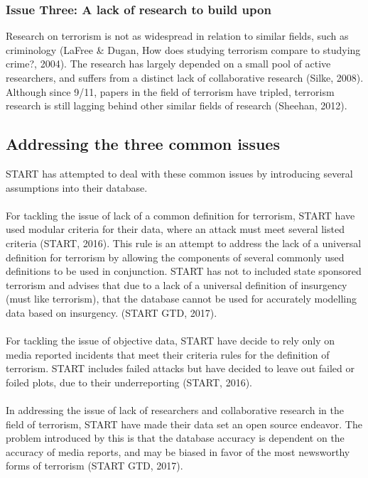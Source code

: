\documentclass[10pt,a4paper]{article}
\begin{document}
			\subsubsection{Issue Three: A lack of research to build upon}
Research on terrorism is not as widespread in relation to similar fields, such as criminology (LaFree \& Dugan, How does studying terrorism compare to studying crime?, 2004). The research has largely depended on a small pool of active researchers, and suffers from a distinct lack of collaborative research (Silke, 2008). Although since 9/11, papers in the field of terrorism have tripled, terrorism research is still lagging behind other similar fields of research (Sheehan, 2012).

		\subsection{Addressing the three common issues}
START has attempted to deal with these common issues by introducing several assumptions into their database.\\\\

For tackling the issue of lack of a common definition for terrorism, START have used modular criteria for their data, where an attack must meet several listed criteria (START, 2016). This rule is an attempt to address the lack of a universal definition for terrorism by allowing the components of several commonly used definitions to be used in conjunction.  START has not to included state sponsored terrorism and advises that due to a lack of a universal definition of insurgency (must like terrorism), that the database cannot be used for accurately modelling data based on insurgency. (START GTD, 2017).\\\\

For tackling the issue of objective data, START have decide to rely only on media reported incidents that meet their criteria rules for the definition of terrorism. START includes failed attacks but have decided to leave out failed or foiled plots, due to their underreporting (START, 2016). \\\\

In addressing the issue of lack of researchers and collaborative research in the field of terrorism, START have made their data set an open source endeavor. The problem introduced by this is that the database accuracy is dependent on the accuracy of media reports, and may be biased in favor of the most newsworthy forms of terrorism (START GTD, 2017).
\end{document}
